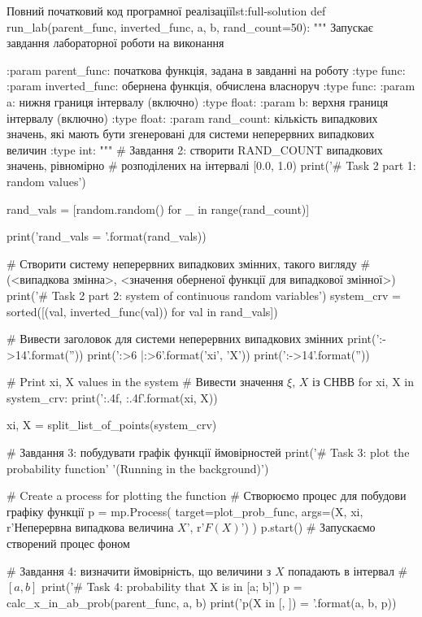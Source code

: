 \documentclass[
	a4paper,
	oneside,
	BCOR = 10mm,
	DIV = 12,
	12pt,
	headings = normal,
]{scrartcl}
\begin{document}
\begin{listingpython}[toprule = 0pt, bottomrule = 0pt]{Повний початковий код програмної реалізації}{lst:full-solution}
def run_lab(parent_func, inverted_func, a, b, rand_count=50):
    """
    Запускає завдання лабораторної роботи на виконання

    :param parent_func: початкова функція, задана в завданні на роботу
    :type func:
    :param inverted_func: обернена функція, обчислена власноруч
    :type func:
    :param a: нижня границя інтервалу (включно)
    :type float:
    :param b: верхня границя інтервалу (включно)
    :type float:
    :param rand_count: кількість випадкових значень, які мають бути згенеровані
        для системи неперервних випадкових величин
    :type int:
    """
    # Завдання 2: створити RAND_COUNT випадкових значень, рівномірно
    # розподілених на інтервалі [0.0, 1.0)
    print('\n# Task 2 part 1: random values')

    rand_vals = [random.random() for _ in range(rand_count)]

    print('rand_vals = {}'.format(rand_vals))

    # Створити систему неперервних випадкових змінних, такого вигляду
    # (<випадкова змінна>, <значення оберненої функції для випадкової змінної>)
    print('\n# Task 2 part 2: system of continuous random variables')
    system_crv = sorted([(val, inverted_func(val)) for val in rand_vals])

    # Вивести заголовок для системи неперервних випадкових змінних
    print('{:->14}'.format(''))
    print('{:>6} |{:>6}'.format('xi', 'X'))
    print('{:->14}'.format(''))

    # Print xi, X values in the system
    # Вивести значення $\xi$, $X$ із СНВВ
    for xi, X in system_crv:
        print('{:.4f}, {:.4f}'.format(xi, X))

    xi, X = split_list_of_points(system_crv)

    # Завдання 3: побудувати графік функції ймовірностей
    print('\n# Task 3: plot the probability function'
          '\n(Running in the background)')

    # Create a process for plotting the function
    # Створюємо процес для побудови графіку функції
    p = mp.Process(
        target=plot_prob_func,
        args=(X, xi,
              r'Неперервна випадкова величина $X$',
              r'$F(X)$')
    )
    p.start()  # Запускаємо створений процес фоном

    # Завдання 4: визначити ймовірність, що величини з $X$ попадають в інтервал
    # $[a, b]$
    print('\n# Task 4: probability that X is in [a; b]')
    p = calc_x_in_ab_prob(parent_func, a, b)
    print('p(X in [{}, {}]) = {}'.format(a, b, p))



\end{listingpython}
\end{document}
